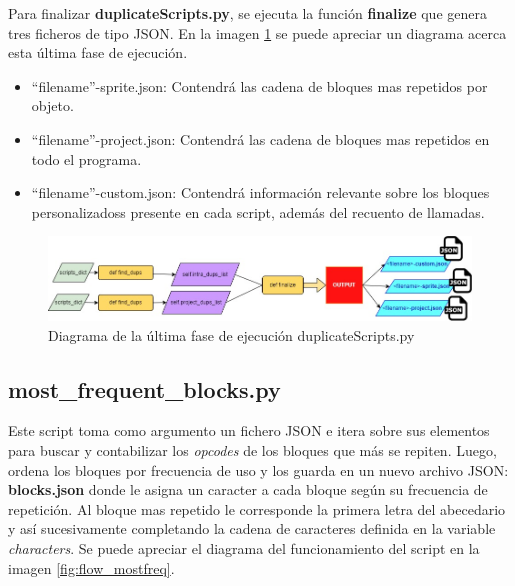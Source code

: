 \documentclass[a4paper, 12pt]{book}
\begin{document}
Para finalizar \textbf{duplicateScripts.py}, se ejecuta la función \textbf{finalize} que genera tres ficheros de tipo JSON. En la imagen \ref{fig:flow_finddups} se puede apreciar un diagrama acerca esta última fase de ejecución.

\begin{itemize}
\item ``filename''-sprite.json: Contendrá las cadena de bloques mas repetidos por objeto.
\item ``filename''-project.json: Contendrá las cadena de bloques mas repetidos en todo el programa.
\item ``filename''-custom.json: Contendrá información relevante sobre los bloques personalizadoss presente en cada script, además del recuento de llamadas.
\end{itemize}

\begin{figure}[!htb]
  \centering
  \includegraphics[width=17cm, keepaspectratio]{img/flow_duplicate.jpg}
  \caption{Diagrama de la última fase de ejecución duplicateScripts.py}
  \label{fig:flow_finddups}
\end{figure}

\subsection{most\_frequent\_blocks.py}

Este script toma como argumento un fichero JSON e itera sobre sus elementos para buscar y contabilizar los \textit{opcodes} de los bloques que más se repiten. Luego, ordena los bloques por frecuencia de uso y los guarda en un nuevo archivo JSON: \textbf{blocks.json} donde le asigna un caracter a cada bloque según su frecuencia de repetición. Al bloque mas repetido le corresponde la primera letra del abecedario y así sucesivamente completando la cadena de caracteres definida en la variable \textit{characters}. Se puede apreciar el diagrama del funcionamiento del script en la imagen \ref{fig:flow_mostfreq}.


\end{document}
